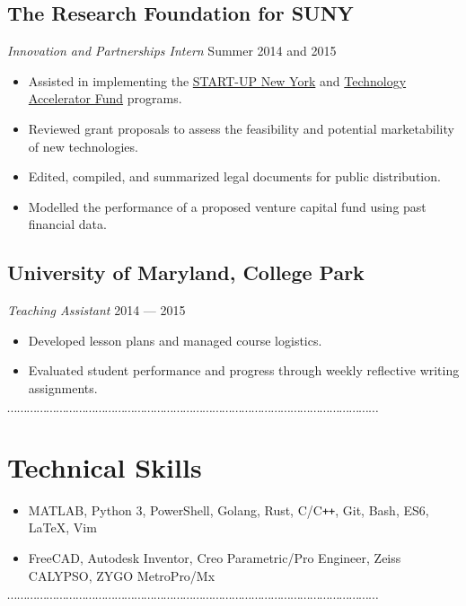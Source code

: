 \documentclass[10pt]{article}
\newcommand{\dotfringe}{
    \begin{center}
      $\cdots\cdots\cdots\cdots\cdots\cdots\cdots\cdots\cdots\cdots\cdots\cdots\cdots\cdots\cdots\cdots\cdots\cdots\cdots\cdots\cdots\cdots\cdots\cdots\cdots\cdots\cdots\cdots\cdots\cdots\cdots\cdots\cdots\cdots\cdots\cdots\cdots\cdots$
    \end{center}
}
\begin{document}
\subsection*{The Research Foundation for SUNY}
\textit{Innovation and Partnerships Intern} \hfill Summer 2014 and 2015
\begin{itemize}
  \item Assisted in implementing the \href{https://startup.ny.gov/}{START-UP New York} and \href{https://www.rfsuny.org/Our-Work/Innovation-and-Partnerships/Programs/Technology-Accelerator-Fund/}{Technology Accelerator Fund} programs.
  \item Reviewed grant proposals to assess the feasibility and potential marketability of new technologies.
  \item Edited, compiled, and summarized legal documents for public distribution.
  \item Modelled the performance of a proposed venture capital fund using past financial data.
\end{itemize}
\subsection*{University of Maryland, College Park}
\textit{Teaching Assistant} \hfill 2014 --- 2015
\begin{itemize}
  \item Developed lesson plans and managed course logistics.
  \item Evaluated student performance and progress through weekly reflective writing assignments.
\end{itemize}
\dotfringe{}
\section*{Technical Skills}
\begin{itemize}
  \item MATLAB, Python 3, PowerShell, Golang, Rust, C/C\texttt{++}, Git, Bash, ES6, \LaTeX{}, Vim
  \item FreeCAD, Autodesk Inventor, Creo Parametric/Pro Engineer, Zeiss CALYPSO, ZYGO MetroPro/Mx
\end{itemize}

\dotfringe{}
\end{document}
